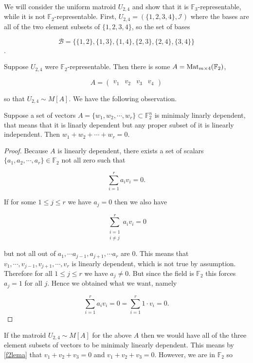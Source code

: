 We will consider the uniform matroid $U_{2,4}$ and show that it is $\mathbb{F}_3$-representable, while it is not $\mathbb{F}_2$-representable. First, $U_{2,4}= (\{1,2,3,4\}, \mathcal{I})$ where the bases are all of the two element subsets of $\{1,2,3,4\}$, so the set of bases 

$$\mathcal{B} = \{\{1,2\}, \{1,3\}, \{1,4\}, \{2,3\}, \{2,4\}, \{3,4\}\}$$.

Suppose $U_{2,4}$ were $\mathbb{F}_2$-representable. Then there is some $A = \text{Mat}_{m \times 4}(\mathbb{F}_2)$, 

$$A = \begin{pmatrix}
    v_1 & v_2 & v_3 & v_4
\end{pmatrix}$$

so that $U_{2,4} \sim M[A]$. We have the following observation.

\begin{lemma}
\label{f2lema}
    Suppose a set of vectors $A = \{w_1, w_2, \cdots, w_r\} \subset \mathbb{F}_2^n$ is minimaly linarly dependent, that means that it is linarly dependent but any proper subset of it is linearly independent. Then $w_1 + w_2 + \cdots + w_r = 0$.
\end{lemma}

\begin{proof}
    Because $A$ is linearly dependent, there exists a set of scalars $\{a_1, a_2, \cdots, a_r\}\in \mathbb{F}_2$ not all zero such that
    
    $$\sum_{i=1}^r a_iv_i = 0.$$
    
    If for some $1\leq j \leq r$ we have $a_j = 0$ then we also have 
    
    $$\sum\limits_{\substack{i = 1 \\ i \neq j}} ^r a_iv_i = 0$$

    but not all out of $a_1, \cdots a_{j-1}, a_{j+1}, \cdots a_r$ are 0. This means that ${v_1, \cdots, v_{j-1}, v_{j+1}, \cdots, v_r}$ is linearly dependent, which is not true by assumption. Therefore for all $1\leq j \leq r$ we have $a_j \neq 0$. But since the field is $\mathbb{F}_2$ this forces $a_j = 1$ for all $j$. Hence we obtained what we want, namely

     $$\sum_{i=1}^r a_iv_i = 0 =  \sum_{i=1}^r 1 \cdot v_i = 0.$$
    
\end{proof}

If the matroid $U_{2,4} \sim M[A]$ for the above $A$ then we would have all of the three element subsets of vectors to be minimaly linearly dependent. This means by \ref{f2lema} that $v_1 + v_2 + v_3 = 0$ and $v_1 + v_2 + v_3 = 0$. However, we are in $\mathbb{F}_2$ so 


